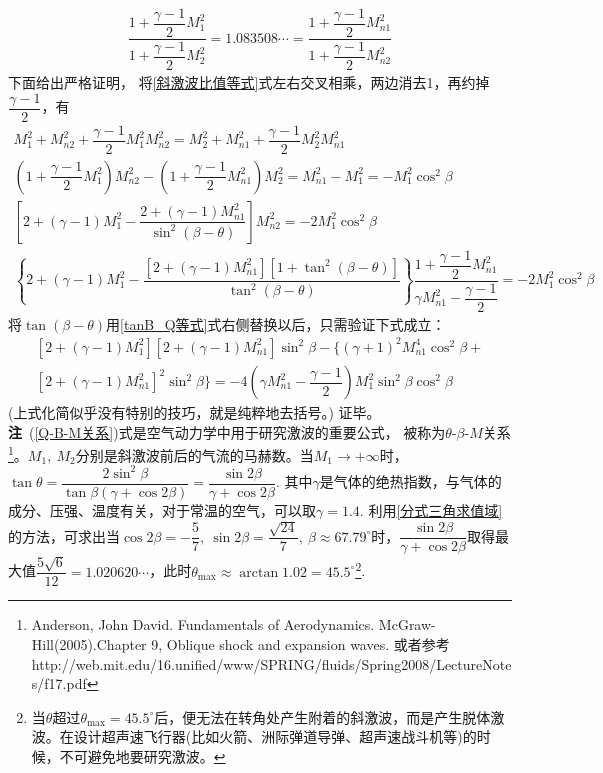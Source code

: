 \begin{enumerate}[label={【\textbf{例\thechapter.\arabic*}】},
 leftmargin=\inteval{\myenumleftmargin}pt,
 itemsep=\inteval{\myenumitempsep}pt,
 itemindent=\inteval{\myenumitemindent}pt]
\begin{align*}
    \dfrac{1+\dfrac{\gamma-1}{2}M_1^2}{1+\dfrac{\gamma-1}{2}M_2^2}
    =1.083508\cdots=
    \dfrac{1+\dfrac{\gamma-1}{2}M_{n1}^2}{1+\dfrac{\gamma-1}{2}M_{n2}^2}
\end{align*}
下面给出严格证明，
将\eqref{斜激波比值等式}式左右交叉相乘，两边消去1，再约掉$ \dfrac{\gamma-1}{2} $，有
\begin{gather*}
    M_1^2+M_{n2}^2+\dfrac{\gamma-1}{2}M_1^2M_{n2}^2=
    M_2^2+M_{n1}^2+\dfrac{\gamma-1}{2}M_2^2M_{n1}^2   \\
    \left(1+\dfrac{\gamma-1}{2}M_1^2\right)M_{n2}^2-
    \left(1+\dfrac{\gamma-1}{2}M_{n1}^2\right)M_{2}^2=M_{n1}^2-M_1^2
    =-M_1^2\cos^2\beta \\
    \left[2+(\gamma-1)M_1^2-\dfrac{2+(\gamma-1) M_{n1}^2}{\sin^2(\beta-\theta)}
    \right]M_{n2}^2=-2M_1^2\cos^2\beta \\
    \left\{2+(\gamma-1)M_1^2-\dfrac{[2+(\gamma-1) M_{n1}^2][1+
        \tan^2(\beta-\theta)]}{\tan^2(\beta-\theta)}
    \right\}\dfrac{1+\dfrac{\gamma-1}{2}M_{n1}^2}{\gamma M_{n1}^2
        -\dfrac{\gamma-1}{2}}=-2M_1^2\cos^2\beta
\end{gather*}
将$ \tan(\beta-\theta) $用\eqref{tanB_Q等式}式右侧替换以后，只需验证下式成立：
\begin{gather*}
    \left[2+(\gamma-1)M_1^2\right]\left[2+(\gamma-1)M_{n1}^2\right]\sin^2\beta-
    \Big\{(\gamma+1)^2M_{n1}^4\cos^2\beta+\\ [2+(\gamma-1) M_{n1}^2]^2
    \sin^2\beta \Big\}=-4\left(\gamma M_{n1}^2-\dfrac{\gamma-1}{2}\right)
    M_1^2\sin^2\beta\cos^2\beta
\end{gather*}
(上式化简似乎没有特别的技巧，就是纯粹地去括号。) 证毕。 \\
\textbf{注}\ (\ref{Q-B-M关系})式是空气动力学中用于研究激波的重要公式，
被称为$ \theta$-$\beta$-$M$关系
\footnote{ Anderson, John David. Fundamentals of Aerodynamics. McGraw-Hill(2005).Chapter 9, Oblique shock and expansion waves. \quad  或者参考 http://web.mit.edu/16.unified/www/SPRING/fluids/Spring2008/LectureNotes/f17.pdf}。$ M_1,\ M_2 $分别是斜激波前后的气流的马赫数。当$ M_1\to +\infty $时，$ \tan\theta=\dfrac{2\sin^2\beta}{\tan\beta(\gamma+\cos2\beta)}=\dfrac{\sin2\beta}{\gamma+\cos2\beta} $. 其中$ \gamma $是气体的绝热指数，与气体的成分、压强、温度有关，对于常温的空气，可以取$ \gamma=1.4 $. 利用\ref{分式三角求值域}的方法，可求出当$ \cos2\beta=-\dfrac{5}{7},\ \sin2\beta=\dfrac{\sqrt{24}}{7},\ \beta\approx 67.79^{\circ} $时，$ \dfrac{\sin2\beta}{\gamma+\cos2\beta} $取得最大值$ \dfrac{5\sqrt{6}}{12}=1.020620\cdots $，此时$ \theta_{\max}\approx\arctan1.02=45.5^{\circ} $\footnote{当$ \theta $超过$ \theta_{\max}=45.5^{\circ} $后，便无法在转角处产生附着的斜激波，而是产生脱体激波。在设计超声速飞行器(比如火箭、洲际弹道导弹、超声速战斗机等)的时候，不可避免地要研究激波。}. \\

\end{enumerate}

